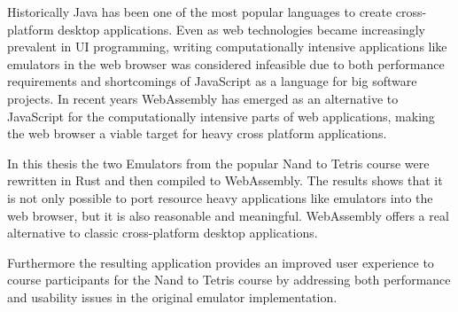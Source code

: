 Historically Java has been one of the most popular languages to create cross-platform desktop applications. Even as web technologies became increasingly prevalent in UI programming, writing computationally intensive applications like emulators in the web browser was considered infeasible due to both performance requirements and shortcomings of JavaScript as a language for big software projects.
In recent years WebAssembly has emerged as an alternative to JavaScript for the computationally intensive parts of web applications, making the web browser a viable target for heavy cross platform applications.

In this thesis the two Emulators from the popular Nand to Tetris course were rewritten in Rust and then compiled to WebAssembly. The results shows that it is not only possible to port resource heavy applications like emulators into the web browser, but it is also reasonable and meaningful. WebAssembly offers a real alternative to classic cross-platform desktop applications.

Furthermore the resulting application provides an improved user experience to course participants for the Nand to Tetris course by addressing both performance and usability issues in the original emulator implementation.
